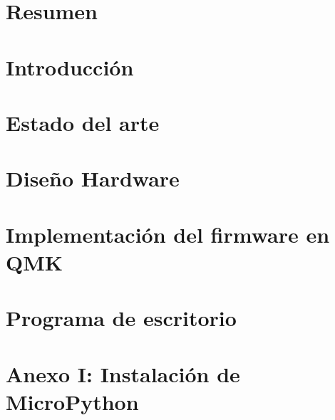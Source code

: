 


  


  \chapter*{Resumen}
    

  \tableofcontents \label{chapter:contents}

  \chapter{Introducción}
    

  \chapter{Estado del arte}
    

  \chapter{Diseño Hardware}
    

  \chapter{Implementación del firmware en QMK}
      

  \chapter{Programa de escritorio}
    

  \chapter{Anexo I: Instalación de MicroPython}
    


